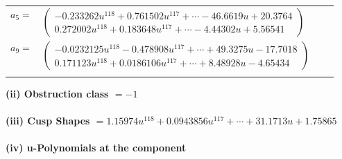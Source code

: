 \documentclass[1p]{elsarticle_modified}
\theoremstyle{definition}
\begin{document}
\begin{tabular}{m{7pt} m{180pt} m{7pt} m{180pt} }
\flushright $a_{5}=$&$\begin{pmatrix}-0.233262 u^{118}+0.761502 u^{117}+\cdots-46.6619 u+20.3764\\0.272002 u^{118}+0.183648 u^{117}+\cdots-4.44302 u+5.56541\end{pmatrix}$ \\
\flushright $a_{9}=$&$\begin{pmatrix}-0.0232125 u^{118}-0.478908 u^{117}+\cdots+49.3275 u-17.7018\\0.171123 u^{118}+0.0186106 u^{117}+\cdots+8.48928 u-4.65434\end{pmatrix}$\\&\end{tabular}
\flushleft \textbf{(ii) Obstruction class $= -1$}\\~\\
\flushleft \textbf{(iii) Cusp Shapes $= 1.15974 u^{118}+0.0943856 u^{117}+\cdots+31.1713 u+1.75865$}\\~\\
\newpage\renewcommand{\arraystretch}{1}
\flushleft \textbf{(iv) u-Polynomials at the component}\newline \\
\end{document}
